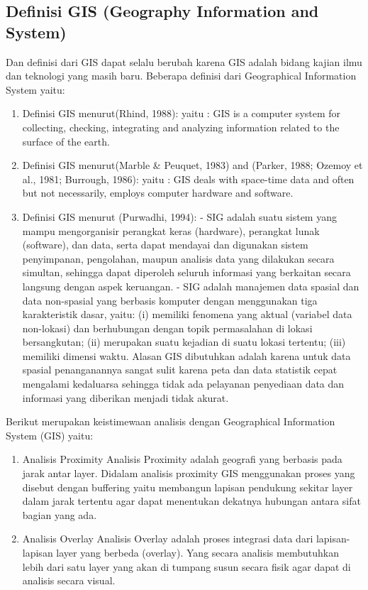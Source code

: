 \subsection{Definisi GIS (Geography Information and System)}
Dan definisi dari GIS dapat selalu berubah karena GIS adalah bidang kajian ilmu 
dan teknologi yang masih baru. Beberapa definisi dari Geographical Information System yaitu:
\begin{enumerate}
\item Definisi GIS menurut(Rhind, 1988):
yaitu : GIS is a computer system for collecting, checking, integrating and analyzing
information related to the surface of the earth.

\item Definisi GIS menurut(Marble \& Peuquet, 1983) and (Parker,
1988; Ozemoy et al., 1981; Burrough, 1986):
yaitu : GIS deals with space-time data and often but not necessarily, employs computer
hardware and software.

\item Definisi GIS menurut (Purwadhi, 1994):
- SIG adalah suatu sistem yang mampu mengorganisir perangkat keras (hardware),
perangkat lunak (software), dan data, serta dapat mendayai dan digunakan sistem
penyimpanan, pengolahan, maupun analisis data yang dilakukan secara simultan, sehingga dapat
diperoleh seluruh informasi yang berkaitan secara langsung dengan aspek keruangan.
- SIG adalah manajemen data spasial dan data non-spasial yang berbasis komputer
dengan menggunakan tiga karakteristik dasar, yaitu: 
(i) memiliki fenomena yang aktual (variabel data non-lokasi) dan berhubungan 
dengan topik permasalahan di lokasi bersangkutan; 
(ii) merupakan suatu kejadian di suatu lokasi tertentu; 
(iii) memiliki dimensi waktu. Alasan GIS dibutuhkan adalah karena untuk data spasial 
penanganannya sangat sulit karena peta dan data statistik cepat mengalami kedaluarsa 
sehingga tidak ada pelayanan penyediaan data dan informasi yang diberikan menjadi tidak akurat.
\end{enumerate} 

Berikut merupakan keistimewaan analisis dengan Geographical Information System (GIS) yaitu:
\begin{enumerate}
\item Analisis Proximity
Analisis Proximity adalah geografi yang berbasis pada jarak antar layer.
Didalam analisis proximity GIS menggunakan proses yang disebut dengan buffering
yaitu membangun lapisan pendukung sekitar layer dalam jarak tertentu agar dapat menentukan
dekatnya hubungan antara sifat bagian yang ada.
\item Analisis Overlay
Analisis Overlay adalah proses integrasi data dari lapisan-lapisan layer yang berbeda (overlay).
Yang secara analisis membutuhkan lebih dari satu layer yang akan di tumpang susun secara
fisik agar dapat di analisis secara visual.
\end{enumerate}


